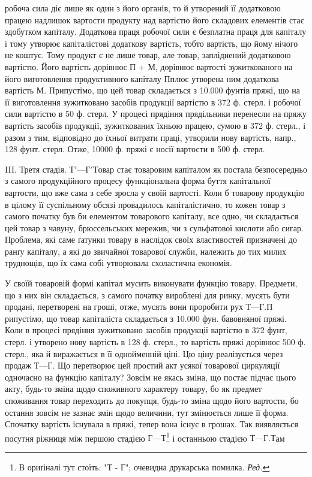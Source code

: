 \parcont{}  %
робоча сила діє лише як один з його органів, то й утворений її додатковою
працею надлишок вартости продукту над вартістю його складових
елементів стає здобутком капіталу. Додаткова праця робочої сили є
безплатна праця для капіталу і тому утворює капіталістові додаткову
вартість, тобто вартість, що йому нічого не коштує. Тому продукт є не
лише товар, але товар, запліднений додатковою вартістю. Його вартість
дорівнює П + М, дорівнює вартості зужиткованого на його виготовлення
продуктивного капіталу $П п$люс утворена ним додаткова вартість М.
Припустімо, що цей товар складається з 10.000 фунтів пряжі, що на її
виготовлення зужитковано засобів продукції вартістю в 372 ф. стерл. і
робочої сили вартістю в 50 ф. стерл. У процесі прядіння прядільники
перенесли на пряжу вартість засобів продукції, зужиткованих їхньою
працею, сумою в 372 ф. стерл., і разом з тим, відповідно до їхньої
витрати праці, утворили нову вартість, напр., 128 фунт. стерл. Отже,
10000 ф. пряжі є носії вартости в 500 ф. стерл.

III. Третя стадія. $Т' — Г'

Т$овар стає товаровим капіталом як постала безпосередньо з самого
продукційного процесу функціональна форма буття капітальної вартости,
що вже сама з себе зросла у своїй вартості. Коли б товарову продукцію
в цілому її суспільному обсязі провадилось капіталістично, то кожен
товар з самого початку був би елементом товарового капіталу, все одно,
чи складається цей товар з чавуну, брюссельських мережив, чи з сульфатової
кислоти або сигар. Проблема, які саме ґатунки товару в наслідок своїх
властивостей призначені до ранґу капіталу, а які до звичайної товарової
служби, належить до тих милих труднощів, що їх сама собі утворювала
схоластична економія.

У своїй товаровій формі капітал мусить виконувати функцію товару.
Предмети, що з них він складається, з самого початку вироблені для
ринку, мусять бути продані, перетворені на гроші, отже, мусять вони
проробити рух $Т — Г.

П$рипустімо, що товар капіталіста складається з 10.000 фун. бавовняної
пряжі. Коли в процесі прядіння зужитковано засобів продукції вартістю
в 372 фунт, стерл. і утворено нову вартість в 128 ф. стерл., то вартість
пряжі дорівнює 500 ф. стерл., яка й виражається в її однойменній ціні.
Цю ціну реалізується через продаж $Т — Г$. Що перетворює цей простий
акт усякої товарової циркуляції одночасно на функцію капіталу? Зовсім
не якась зміна, що постає підчас цього акту, будь-то зміна щодо споживного
характеру товару, бо як предмет споживання товар переходить до покупця,
будь-то зміна щодо його вартости, бо остання зовсім не зазнає змін
щодо величини, тут змінюється лише її форма. Спочатку вартість існувала
в пряжі, тепер вона існує в грошах. Так виявляється посутня
ріжниця між першою стадією $Г — Т$\footnote*{
В ориґіналі тут стоїть: "Т - Г"; очевидна друкарська помилка. \emph{Ред.}
} і останньою стадією $Т — Г. Т$ам
\parbreak{}  %
